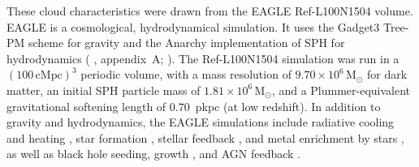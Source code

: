 \documentclass[fleqn,usenatbib]{mnras}
\begin{document}
These cloud characteristics were drawn from the EAGLE Ref-L100N1504 volume.
EAGLE \citep[`Evolution and Assembly of GaLaxies and their Environments';][]{Schaye2015,Crain2015,McAlpine2016} is a cosmological, hydrodynamical simulation.
It uses the Gadget3 Tree-PM scheme for gravity \citep[][]{Springel2005} and the Anarchy implementation of SPH for hydrodynamics (\citeauthor{Schaye2015} \citeyear{Schaye2015}, appendix~A; \citeauthor{Schaller2015} \citeyear{Schaller2015}).
The Ref-L100N1504 simulation was run in a $(100\,\mathrm{cMpc})^3$ periodic volume, with a mass resolution of $9.70 \times 10^6 \,\mathrm{M}_{\odot}$ for dark matter, an initial SPH particle mass of $1.81 \times 10^6 \,\mathrm{M}_{\odot}$, and a Plummer-equivalent gravitational softening length of $0.70$~pkpc (at low redshift).
In addition to gravity and hydrodynamics, the EAGLE simulations include radiative cooling and heating \citep{Wiersma2009a}, star formation \citep{Schaye2004, Schaye2008}, stellar feedback \citep{DallaVecchia2012}, and metal enrichment by stars \citep{Wiersma2009}, as well as black hole seeding, growth \citep{Rosas-Guevara2015}, and AGN feedback \citep{Booth2009}.
\end{document}

